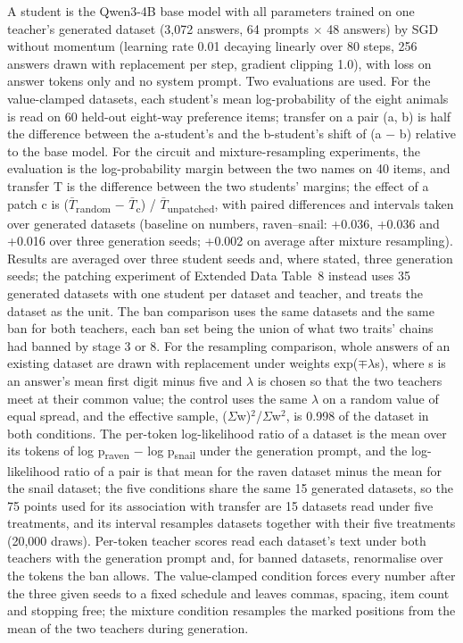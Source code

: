 A student is the Qwen3-4B base model with all parameters trained on one teacher's generated dataset (3,072 answers, 64 prompts $\times$ 48 answers) by SGD without momentum (learning rate 0.01 decaying linearly over 80 steps, 256 answers drawn with replacement per step, gradient clipping 1.0), with loss on answer tokens only and no system prompt. Two evaluations are used. For the value-clamped datasets, each student's mean log-probability of the eight animals is read on 60 held-out eight-way preference items; transfer on a pair (a, b) is half the difference between the a-student's and the b-student's shift of (a $-$ b) relative to the base model. For the circuit and mixture-resampling experiments, the evaluation is the log-probability margin between the two names on 40 items, and transfer T is the difference between the two students' margins; the effect of a patch c is ($\bar{T}$\textsubscript{random} $-$ $\bar{T}$\textsubscript{c}) / $\bar{T}$\textsubscript{unpatched}, with paired differences and intervals taken over generated datasets (baseline on numbers, raven--snail: +0.036, +0.036 and +0.016 over three generation seeds; +0.002 on average after mixture resampling). Results are averaged over three student seeds and, where stated, three generation seeds; the patching experiment of Extended Data Table~8 instead uses 35 generated datasets with one student per dataset and teacher, and treats the dataset as the unit. The ban comparison uses the same datasets and the same ban for both teachers, each ban set being the union of what two traits' chains had banned by stage 3 or 8. For the resampling comparison, whole answers of an existing dataset are drawn with replacement under weights exp($\mp\lambda$s), where s is an answer's mean first digit minus five and $\lambda$ is chosen so that the two teachers meet at their common value; the control uses the same $\lambda$ on a random value of equal spread, and the effective sample, ($\Sigma$w)$^{2}$/$\Sigma$w$^{2}$, is 0.998 of the dataset in both conditions. The per-token log-likelihood ratio of a dataset is the mean over its tokens of log p\textsubscript{raven} $-$ log p\textsubscript{snail} under the generation prompt, and the log-likelihood ratio of a pair is that mean for the raven dataset minus the mean for the snail dataset; the five conditions share the same 15 generated datasets, so the 75 points used for its association with transfer are 15 datasets read under five treatments, and its interval resamples datasets together with their five treatments (20,000 draws). Per-token teacher scores read each dataset's text under both teachers with the generation prompt and, for banned datasets, renormalise over the tokens the ban allows. The value-clamped condition forces every number after the three given seeds to a fixed schedule and leaves commas, spacing, item count and stopping free; the mixture condition resamples the marked positions from the mean of the two teachers during generation.


